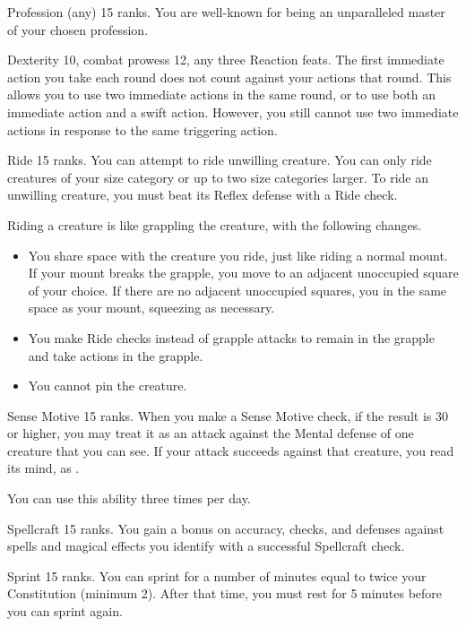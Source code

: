 \featpre Profession (any) 15 ranks.
\featben You are well-known for being an unparalleled master of your chosen profession.

\featpres Dexterity 10, combat prowess 12, any three Reaction feats.
\featben The first immediate action you take each round does not count against your actions that round.
This allows you to use two immediate actions in the same round, or to use both an immediate action and a swift action.
However, you still cannot use two immediate actions in response to the same triggering action.

\featpre Ride 15 ranks.
\featben You can attempt to ride unwilling creature.
You can only ride creatures of your size category or up to two size categories larger.
To ride an unwilling creature, you must beat its Reflex defense with a Ride check.

Riding a creature is like grappling the creature, with the following changes.
\begin{itemize}
    \item You share space with the creature you ride, just like riding a normal mount.
        If your mount breaks the grapple, you move to an adjacent unoccupied square of your choice.
        If there are no adjacent unoccupied squares, you in the same space as your mount, squeezing as necessary.
    \item You make Ride checks instead of grapple attacks to remain in the grapple and take actions in the grapple.
    \item You cannot pin the creature.
\end{itemize}

\featpre Sense Motive 15 ranks.
\featben When you make a Sense Motive check, if the result is 30 or higher, you may treat it as an attack against the Mental defense of one creature that you can see.
If your attack succeeds against that creature, you read its mind, as .

You can use this ability three times per day.

\featpre Spellcraft 15 ranks.
\featben You gain a  bonus on accuracy, checks, and defenses against spells and magical effects you identify with a successful Spellcraft check.

\featpre Sprint 15 ranks.
\featben You can sprint for a number of minutes equal to twice your Constitution (minimum 2).
After that time, you must rest for 5 minutes before you can sprint again.

